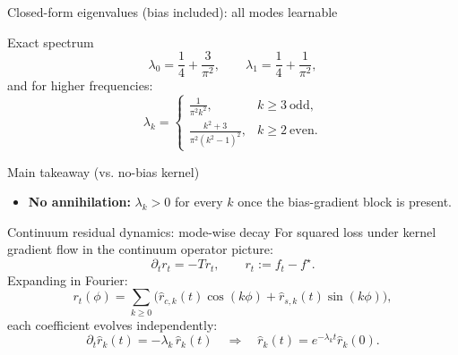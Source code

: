 \documentclass[10pt,aspectratio=169]{beamer}
\begin{document}
\begin{frame}{Closed-form eigenvalues (bias included): all modes learnable}
	\small
	\begin{block}{Exact spectrum}
		\[
			\boxed{
				\lambda_0=\frac14+\frac{3}{\pi^2},\qquad
				\lambda_1=\frac14+\frac{1}{\pi^2},
			}
		\]
		and for higher frequencies:
		\[
			\boxed{
				\lambda_k=
				\begin{cases}
					\displaystyle \frac{1}{\pi^2 k^2},           & k\ge 3\ \text{odd},  \\[8pt]
					\displaystyle \frac{k^2+3}{\pi^2 (k^2-1)^2}, & k\ge 2\ \text{even}.
				\end{cases}
			}
		\]
	\end{block}

	\begin{block}{Main takeaway (vs. no-bias kernel)}
		\begin{itemize}
			\item \textbf{No annihilation:} $\lambda_k>0$ for every $k$ once the bias-gradient block is present.
		\end{itemize}
	\end{block}

\end{frame}

\begin{frame}{Continuum residual dynamics: mode-wise decay}
	\small
	For squared loss under kernel gradient flow in the continuum operator picture:
	\[
		\partial_t r_t = -T r_t,\qquad r_t := f_t - f^\star.
	\]
	Expanding in Fourier:
	\[
		r_t(\phi)=\sum_{k\ge 0}\big(\hat r_{c,k}(t)\cos(k\phi)+\hat r_{s,k}(t)\sin(k\phi)\big),
	\]
	each coefficient evolves independently:
	\[
		\boxed{
		\partial_t \hat r_k(t) = -\lambda_k\,\hat r_k(t)
		\quad\Rightarrow\quad
		\hat r_k(t)=e^{-\lambda_k t}\hat r_k(0).
		}
	\]
\end{frame}
\end{document}
